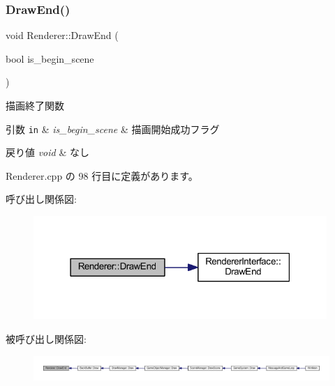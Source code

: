 \subsubsection{\texorpdfstring{Draw\+End()}{DrawEnd()}}
{\footnotesize\ttfamily void Renderer\+::\+Draw\+End (\begin{DoxyParamCaption}\item[{bool}]{is\+\_\+begin\+\_\+scene }\end{DoxyParamCaption})}



描画終了関数 


\begin{DoxyParams}[1]{引数}
\mbox{\tt in}  & {\em is\+\_\+begin\+\_\+scene} & 描画開始成功フラグ \\
\hline
\end{DoxyParams}

\begin{DoxyRetVals}{戻り値}
{\em void} & なし \\
\hline
\end{DoxyRetVals}


 Renderer.\+cpp の 98 行目に定義があります。

呼び出し関係図\+:\nopagebreak
\begin{figure}[H]
\begin{center}
\leavevmode
\includegraphics[width=315pt]{class_renderer_a0393849bd4178a33861780bf07b0deee_cgraph}
\end{center}
\end{figure}
被呼び出し関係図\+:
\nopagebreak
\begin{figure}[H]
\begin{center}
\leavevmode
\includegraphics[width=350pt]{class_renderer_a0393849bd4178a33861780bf07b0deee_icgraph}
\end{center}
\end{figure}
\mbox{\label{class_renderer_a56662123051f8898c4e8e9d5457fd317}} 
